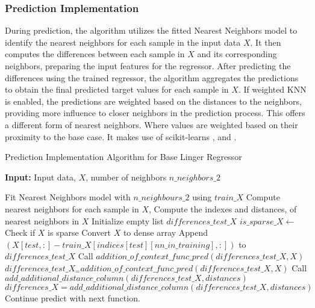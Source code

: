 \documentclass[a4paper, 12pt]{report}
\begin{document}
\subsubsection{Prediction Implementation}
During prediction, the algorithm utilizes the fitted Nearest Neighbors model to identify the nearest neighbors for each sample in the input data $X$. 
It then computes the differences between each sample in $X$ and its corresponding neighbors, 
preparing the input features for the regressor. After predicting the differences using the trained regressor, 
the algorithm aggregates the predictions to obtain the final predicted target values for each sample in $X$.
If weighted KNN is enabled, the predictions are weighted based on the distances to the neighbors, 
providing more influence to closer neighbors in the prediction process. 
This offers a different form of nearest neighbors. Where values are weighted based on their proximity to the base case.
It makes use of scikit-learns \cite{scikit-learn} , and .

\begin{algorithm}[H]
    \caption{Prediction Implementation Algorithm for Base Linger Regressor}
    \textbf{Input:} Input data, $X$, number of neighbors $n\_neighbors\_2$
    \label{alg:base_linger_regressor_predict_part1}
    \begin{algorithmic}[1]
            \State Fit Nearest Neighbors model with $n\_neighbours\_2$ using $train\_X$
            \State Compute nearest neighbors for each sample in $X$, 
            \State Compute the indexes and distances, of nearest neighbors in $X$
            \State Initialize empty list $differences\_test\_X$
            \State $is\_sparse\_X \gets$ Check if $X$ is sparse
                \State Convert $X$ to dense array
            \EndIf
                    \State Append $(X[test, :] - train\_X[indices[test][nn\_in\_training], :])$ to $differences\_test\_X$
                \EndFor
            \EndFor
                \State Call $addition\_of\_context\_func\_pred(differences\_test\_X, X)$
                \State $differences\_test\_X_= addition\_of\_context\_func\_pred(differences\_test\_X, X)$
                \State Call $add\_additional\_distance\_column(differences\_test\_X, distances)$
                \State $differences\_X = add\_additional\_distance\_column(differences\_test\_X, distances)$
            \EndIf
            \State Continue predict with next function.
        \EndFunction
    \end{algorithmic}
\end{algorithm}
\end{document}

